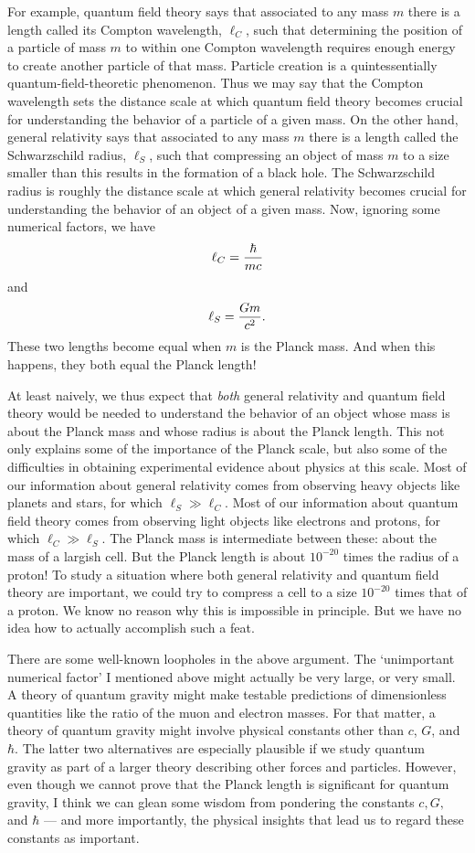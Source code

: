 \documentclass[12pt,amsfonts]{article}
\begin{document}
For example, quantum field theory says that associated to any mass $m$
there is a length called its Compton wavelength, $\ell_C$, such that
determining the position of a particle of mass $m$ to within one Compton
wavelength requires enough energy to create another particle of that
mass.  Particle creation is a quintessentially quantum-field-theoretic
phenomenon.  Thus we may say that the Compton wavelength sets the
distance scale at which quantum field theory becomes crucial for
understanding the behavior of a particle of a given mass.  On the other
hand, general relativity says that associated to any mass $m$ there is a
length called the Schwarzschild radius, $\ell_S$, such that compressing
an object of mass $m$ to a size smaller than this results in the
formation of a black hole.  The Schwarzschild radius is roughly the
distance scale at which general relativity becomes crucial for
understanding the behavior of an object of a given mass.  Now, ignoring
some numerical factors, we have   
\[       \ell_C = {\hbar \over mc}  \]   
and  
\[       \ell_S = {Gm\over c^2}. \]   
These two lengths become equal when $m$ is the Planck mass.  And 
when this happens, they both equal the Planck length!

At least naively, we thus expect that {\it both} general relativity and
quantum field theory would be needed to understand the behavior of an
object whose mass is about the Planck mass and whose radius is about the
Planck length.  This not only explains some of the importance of the
Planck scale, but also some of the difficulties in obtaining
experimental evidence about physics at this scale.  Most of our
information about general relativity comes from observing heavy objects
like planets and stars, for which $\ell_S \gg \ell_C$.   Most of our
information about quantum field theory comes from observing light
objects like electrons and protons, for which $\ell_C \gg \ell_S$.  The
Planck mass is intermediate between these: about the mass of a largish
cell.  But the Planck length is about $10^{-20}$ times
the radius of a proton!   To study a situation where both general
relativity and quantum field theory are important, we could try to
compress a cell to a size $10^{-20}$ times that of a proton.   We
know no reason why this is impossible in principle.  But we have no idea
how to actually accomplish such a feat.  

There are some well-known loopholes in the above argument.   The
`unimportant numerical factor' I mentioned above might actually be very
large, or very small.  A theory of quantum gravity might make testable
predictions of dimensionless quantities like the ratio of the muon and
electron masses.  For that matter, a theory of quantum gravity might
involve physical constants other than $c$, $G$,  and $\hbar$.  The
latter two alternatives are especially plausible if we study quantum
gravity as part of a larger theory describing other forces and
particles.   However, even though we cannot prove that the Planck length
is significant for quantum gravity, I think we can glean some wisdom
from pondering the constants $c,G,$ and $\hbar$ --- and more
importantly, the physical insights that lead us to regard these
constants as important.
\end{document}
